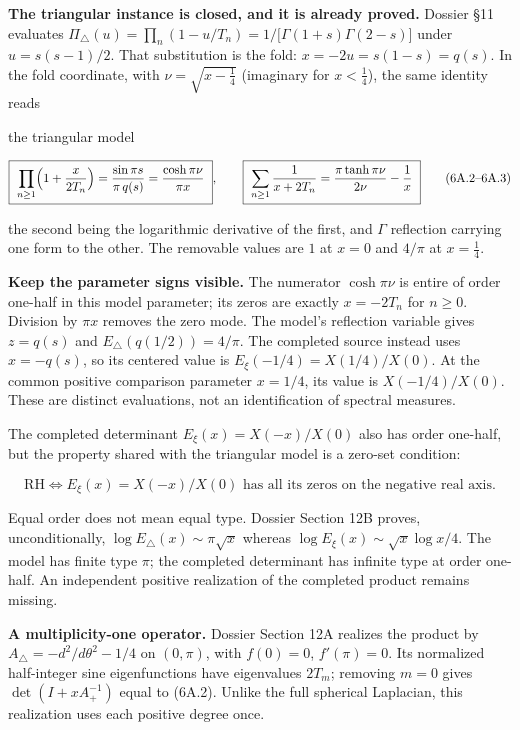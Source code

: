 \documentclass[
  11pt,
]{book}
\begin{document}
\textbf{The triangular instance is closed, and it is already proved.}
Dossier §11 evaluates
\(\Pi_\triangle(u)=\prod_n(1-u/T_n)=1/\bigl[\Gamma(1+s)\Gamma(2-s)\bigr]\)
under \(u=s(s-1)/2\). That substitution is the fold:
\(x=-2u=s(1-s)=q(s)\). In the fold coordinate, with
\(\nu=\sqrt{x-\tfrac14}\) (imaginary for \(x<\tfrac14\)), the same
identity reads

\begin{tnclosed}{the triangular model}

\[
\boxed{\ \prod_{n\ge1}\Bigl(1+\frac x{2T_n}\Bigr)
=\frac{\sin\pi s}{\pi\,q(s)}
=\frac{\cosh\pi\nu}{\pi x}\ },
\qquad
\boxed{\ \sum_{n\ge1}\frac1{x+2T_n}=\frac{\pi\tanh\pi\nu}{2\nu}-\frac1x\ }
\tag{6A.2--6A.3}
\]

\end{tnclosed}

the second being the logarithmic derivative of the first, and \(\Gamma\)
reflection carrying one form to the other. The removable values are
\(1\) at \(x=0\) and \(4/\pi\) at \(x=\tfrac14\).

\textbf{Keep the parameter signs visible.} The numerator \(\cosh\pi\nu\)
is entire of order one-half in this model parameter; its zeros are
exactly \(x=-2T_n\) for \(n\ge0\). Division by \(\pi x\) removes the
zero mode. The model's reflection variable gives \(z=q(s)\) and
\(E_\triangle(q(1/2))=4/\pi\). The completed source instead uses
\(x=-q(s)\), so its centered value is \(E_\xi(-1/4)=X(1/4)/X(0)\). At
the common positive comparison parameter \(x=1/4\), its value is
\(X(-1/4)/X(0)\). These are distinct evaluations, not an identification
of spectral measures.

The completed determinant \(E_\xi(x)=X(-x)/X(0)\) also has order
one-half, but the property shared with the triangular model is a
zero-set condition:

\[
\boxed{\mathrm{RH}\iff E_\xi(x)=X(-x)/X(0)
\text{ has all its zeros on the negative real axis}.}
\tag{6A.4}
\]

Equal order does not mean equal type. Dossier Section 12B proves,
unconditionally, \(\log E_\triangle(x)\sim\pi\sqrt x\) whereas
\(\log E_\xi(x)\sim\sqrt x\log x/4\). The model has finite type \(\pi\);
the completed determinant has infinite type at order one-half. An
independent positive realization of the completed product remains
missing.

\textbf{A multiplicity-one operator.} Dossier Section 12A realizes the
product by \(A_\triangle=-d^2/d\theta^2-1/4\) on \((0,\pi)\), with
\(f(0)=0\), \(f'(\pi)=0\). Its normalized half-integer sine
eigenfunctions have eigenvalues \(2T_m\); removing \(m=0\) gives
\(\det(I+xA_+^{-1})\) equal to (6A.2). Unlike the full spherical
Laplacian, this realization uses each positive degree once.
\end{document}
